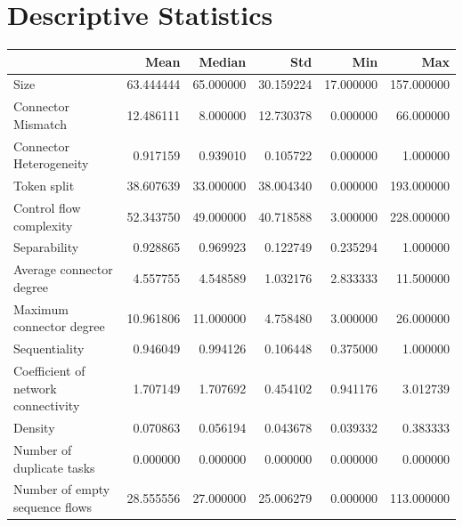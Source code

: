 \documentclass[a4paper]{article}
\begin{document}
\section*{Descriptive Statistics}
\begin{center}
\begin{tabular}{lrrrrr}
\toprule
 & Mean & Median & Std & Min & Max \\
\midrule
Size & 63.444444 & 65.000000 & 30.159224 & 17.000000 & 157.000000 \\
Connector Mismatch & 12.486111 & 8.000000 & 12.730378 & 0.000000 & 66.000000 \\
Connector Heterogeneity & 0.917159 & 0.939010 & 0.105722 & 0.000000 & 1.000000 \\
Token split & 38.607639 & 33.000000 & 38.004340 & 0.000000 & 193.000000 \\
Control flow complexity & 52.343750 & 49.000000 & 40.718588 & 3.000000 & 228.000000 \\
Separability & 0.928865 & 0.969923 & 0.122749 & 0.235294 & 1.000000 \\
Average connector degree & 4.557755 & 4.548589 & 1.032176 & 2.833333 & 11.500000 \\
Maximum connector degree & 10.961806 & 11.000000 & 4.758480 & 3.000000 & 26.000000 \\
Sequentiality & 0.946049 & 0.994126 & 0.106448 & 0.375000 & 1.000000 \\
Coefficient of network connectivity & 1.707149 & 1.707692 & 0.454102 & 0.941176 & 3.012739 \\
Density & 0.070863 & 0.056194 & 0.043678 & 0.039332 & 0.383333 \\
Number of duplicate tasks & 0.000000 & 0.000000 & 0.000000 & 0.000000 & 0.000000 \\
Number of empty sequence flows & 28.555556 & 27.000000 & 25.006279 & 0.000000 & 113.000000 \\
\bottomrule
\end{tabular}
\end{center}
\end{document}
